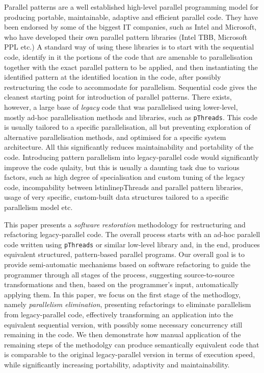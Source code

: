 \documentclass[runningheads]{llncs}
\begin{document}
Parallel patterns are a well established high-level parallel programming model for producing portable, maintainable, adaptive and efficient parallel code. They have been endorsed by some of the biggest IT companies, such as Intel and Microsoft, who have developed their own parallel pattern libraries (Intel TBB, Microsoft PPL etc.) A standard way of using these libraries is to start with the sequential code, identify in it the portions of the code that are amenable to parallelisation together with the exact parallel pattern to be applied, and then instantiating the identified pattern at the identified location in the code, after possibly restructuring the code to accommodate for parallelism. Sequential code gives the cleanest starting point for introduction of parallel patterns. There exists, however, a large base of \emph{legacy} code that was parallelised using lower-level, mostly ad-hoc parallelisation methods and libraries, such as \lstinline{pThreads}. This code is usually tailored to a specific parallelisation, all but preventing exploration of alternative parallelisation methods, and optimised for a specific system architecture. All this significantly reduces maintainability and portability of the code. %
Introducing pattern parallelism into legacy-parallel code would significantly improve the code qulaity, but this is usually a daunting task due to various factors, such as high degree of specialisation and custom tuning of the legacy code, incompability between lstinline{pThreads} and parallel pattern libraries, usage of very specific, custom-built data structures tailored to a specific parallelism model etc.
  
This paper presents a \emph{software restoration} methodology for restructuring and refactoring legacy-parallel code. The overall process starts with an ad-hoc paralell code written using \lstinline{pThreads} or similar low-level library and, in the end, produces equivalent structured, pattern-based parallel programs. Our overall goal is to provide semi-automatic mechanisms based on software refactoring to guide the programmer through all stages of the process, suggesting source-to-source transformations and then, based on the programmer's input, automatically applying them. In this paper, we focus on the first stage of the methodlogy, namely \emph{parallelism elimination}, presenting refactorings to eliminate parallelism from legacy-parallel code, effectively transforming an application into the equivalent sequential version, with possibly some necessary concurrency still remaining in the code. We then demonstrate how manual application of the remaining steps of the methodolgy can produce semantically equivalent code that is comparable to the original legacy-parallel version in terms of execution speed, while significantly increasing portability, adaptivity and maintainability.
\end{document}
